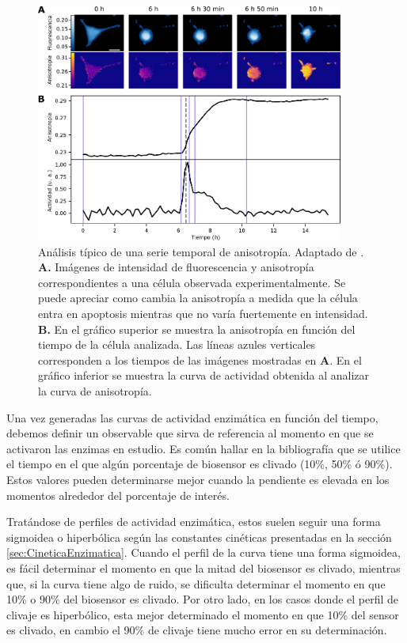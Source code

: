 \begin{figure}[htb]
    \centering
    \includegraphics[width=0.9\textwidth]{img/cap_2/typical_derivation.pdf}
    \caption{\footnotesize{Análisis típico de una serie temporal de anisotropía. Adaptado de \cite{Corbat2018}. \textbf{A.} Imágenes de intensidad de fluorescencia y anisotropía correspondientes a una célula observada experimentalmente. Se puede apreciar como cambia la anisotropía a medida que la célula entra en apoptosis mientras que no varía fuertemente en intensidad. \textbf{B.} En el gráfico superior se muestra la anisotropía en función del tiempo de la célula analizada. Las líneas azules verticales corresponden a los tiempos de las imágenes mostradas en \textbf{A}. En el gráfico inferior se muestra la curva de actividad obtenida al analizar la curva de anisotropía.}}
    \label{fig:derivacion_tipica}
\end{figure}

Una vez generadas las curvas de actividad enzimática en función del tiempo, debemos definir un observable que sirva de referencia al momento en que se activaron las enzimas en estudio. Es común hallar en la bibliografía que se utilice el tiempo en el que algún porcentaje de biosensor es clivado (10\%, 50\% ó 90\%). Estos valores pueden determinarse mejor cuando la pendiente es elevada en los momentos alrededor del porcentaje de interés. 

Tratándose de perfiles de actividad enzimática, estos suelen seguir una forma sigmoidea o hiperbólica según las constantes cinéticas presentadas en la sección \ref{sec:CineticaEnzimatica}. Cuando el perfil de la curva tiene una forma sigmoidea, es fácil determinar el momento en que la mitad del biosensor es clivado, mientras que, si la curva tiene algo de ruido, se dificulta determinar el momento en que 10\% o 90\% del biosensor es clivado. Por otro lado, en los casos donde el perfil de clivaje es hiperbólico, esta mejor determinado el momento en que 10\% del sensor es clivado, en cambio el 90\% de clivaje tiene mucho error en su determinación.

